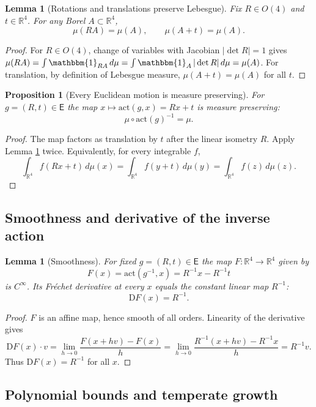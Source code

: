 \documentclass{article}
\newcommand{\Rd}{\mathbb{R}^4}
\newcommand{\1}{\mathbbm{1}}
\theoremstyle{plain}
\newtheorem{prop}[theorem]{Proposition}
\newtheorem{lemma}[theorem]{Lemma}
\theoremstyle{definition}
\numberwithin{equation}{section}
\begin{document}
\begin{lemma}[Rotations and translations preserve Lebesgue]\label{lem:rot+trans}
Fix $R\in O(4)$ and $t\in\Rd$. For any Borel $A\subset\Rd$,
\[
\mu(RA)=\mu(A), \qquad \mu(A+t)=\mu(A).
\]
\end{lemma}

\begin{proof}
For $R\in O(4)$, change of variables with Jacobian $|\det R|=1$ gives $\mu(RA)=\int \1_{RA} \,d\mu=\int \1_A \,|\det R|\, d\mu=\mu(A)$. For translation, by definition of Lebesgue measure, $\mu(A+t)=\mu(A)$ for all $t$.
\end{proof}

\begin{prop}[Every Euclidean motion is measure preserving]\label{prop:measure-preserving}
For $g=(R,t)\in \mathsf{E}$ the map $x\mapsto \mathrm{act}(g,x)=Rx+t$ is measure preserving:
\[
\mu\circ \mathrm{act}(g)^{-1}=\mu.
\]
\end{prop}

\begin{proof}
The map factors as translation by $t$ after the linear isometry $R$. Apply Lemma \ref{lem:rot+trans} twice. Equivalently, for every integrable $f$,
\[
\int_{\Rd} f(Rx+t)\,d\mu(x)
=\int_{\Rd} f(y+t)\,d\mu(y)
=\int_{\Rd} f(z)\,d\mu(z).
\]
\end{proof}

\subsection{Smoothness and derivative of the inverse action}

\begin{lemma}[Smoothness]\label{lem:contdiff}
For fixed $g=(R,t)\in\mathsf{E}$ the map $F:\Rd\to\Rd$ given by
\[
F(x)=\mathrm{act}(g^{-1},x)=R^{-1}x - R^{-1}t
\]
is $C^\infty$. Its Fréchet derivative at every $x$ equals the constant linear map $R^{-1}$:
\[
\mathrm{D}F(x)=R^{-1}.
\]
\end{lemma}

\begin{proof}
$F$ is an affine map, hence smooth of all orders. Linearity of the derivative gives
\[
\mathrm{D}F(x)\cdot v
=\lim_{h\to 0}\frac{F(x+hv)-F(x)}{h}
=\lim_{h\to 0}\frac{R^{-1}(x+hv)-R^{-1}x}{h}
=R^{-1}v.
\]
Thus $\mathrm{D}F(x)=R^{-1}$ for all $x$.
\end{proof}

\subsection{Polynomial bounds and temperate growth}
\end{document}
